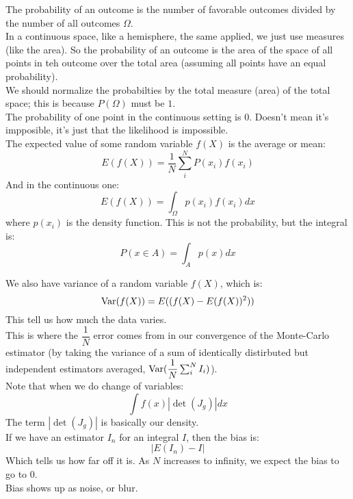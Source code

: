 \documentclass[12pt]{article}
\begin{document}
The probability of an outcome is the number
of favorable outcomes divided by the
number of all outcomes $\Omega$. \\

In a continuous space, like a hemisphere,
the same applied, we just use measures
(like the area).
So the probability of an outcome
is the area of the space of all points
in teh outcome over the total area
(assuming all points have an equal probability). \\

We should normalize the probabilties by the
total measure (area) of the total space;
this is because $P(\Omega)$ must be $1$. \\

The probability of one point in the continuous
setting is 0. Doesn't mean it's impposible,
it's just that the likelihood is impossible. \\

The expected value of some random variable
$f(X)$ is the average or mean:
\[ E(f(X)) = \dfrac{1}{N}\sum_i^N P(x_i)f(x_i) \]
And in the continuous one:
\[ E(f(X)) = \int_\Omega p(x_i)f(x_i) dx \]
where $p(x_i)$ is the density function.
This is not the probability, but the integral is:
\[P(x \in A) = \int_A p(x)dx \]

We also have variance of a random variable
$f(X)$, which is:
\[ \text{Var}(f(X)) = E((f(X) - E(f(X))^2)) \]
This tell us how much the data varies. \\

This is where the $\dfrac{1}{N}$ error
comes from in our convergence of the Monte-Carlo
estimator (by taking the variance
of a sum of identically distirbuted but
independent estimators averaged,
$\text{Var}(\dfrac{1}{N}\sum_i^N I_i)$). \\

Note that when we do change of variables:
\[ \int f(x) |\det(J_g)| dx \]
The term $|\det(J_g)|$ is basically our
density. \\

If we have an estimator $I_n$ for an integral $I$,
then the bias is:
\[ | E(I_n) - I | \]
Which tells us how far off it is.
As $N$ increases to infinity, we 
expect the bias to go to $0$. \\

Bias shows up as noise, or blur. \\
\end{document}
